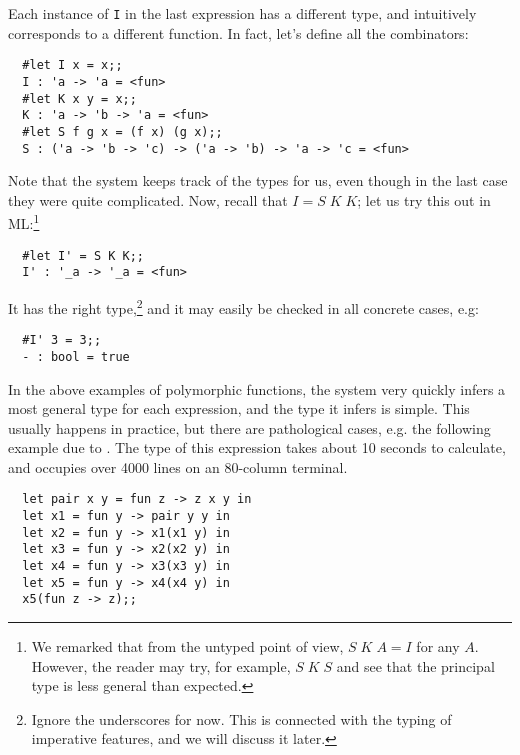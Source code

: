 Each instance of {\tt I} in the last expression has a different type, and
intuitively corresponds to a different function. In fact, let's define all the
combinators:

\begin{boxed}\begin{verbatim}
  #let I x = x;;
  I : 'a -> 'a = <fun>
  #let K x y = x;;
  K : 'a -> 'b -> 'a = <fun>
  #let S f g x = (f x) (g x);;
  S : ('a -> 'b -> 'c) -> ('a -> 'b) -> 'a -> 'c = <fun>
\end{verbatim}\end{boxed}

Note that the system keeps track of the types for us, even though in the last
case they were quite complicated. Now, recall that $I = S\; K\; K$; let us try
this out in ML:\footnote{We remarked that from the untyped point of view, $S\;
K\; A = I$ for any $A$. However, the reader may try, for example, $S\; K\; S$
and see that the principal type is less general than expected.}

\begin{boxed}\begin{verbatim}
  #let I' = S K K;;
  I' : '_a -> '_a = <fun>
\end{verbatim}\end{boxed}

\noindent It has the right type,\footnote{Ignore the underscores for now. This
is connected with the typing of imperative features, and we will discuss it
later.} and it may easily be checked in all concrete cases, e.g:

\begin{boxed}\begin{verbatim}
  #I' 3 = 3;;
  - : bool = true
\end{verbatim}\end{boxed}

In the above examples of polymorphic functions, the system very quickly infers
a most general type for each expression, and the type it infers is simple. This
usually happens in practice, but there are pathological cases, e.g. the
following example due to . The type of this expression takes
about 10 seconds to calculate, and occupies over 4000 lines on an 80-column
terminal.

\begin{boxed}\begin{lstlisting}
  let pair x y = fun z -> z x y in
  let x1 = fun y -> pair y y in
  let x2 = fun y -> x1(x1 y) in
  let x3 = fun y -> x2(x2 y) in
  let x4 = fun y -> x3(x3 y) in
  let x5 = fun y -> x4(x4 y) in
  x5(fun z -> z);;
\end{lstlisting}\end{boxed}

